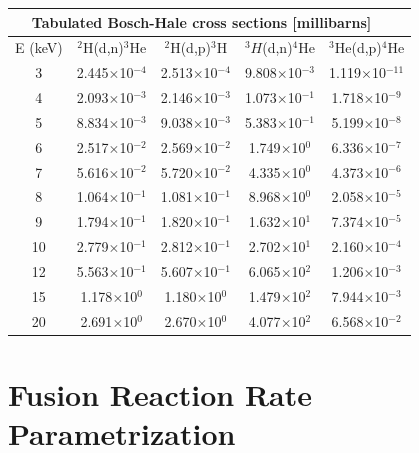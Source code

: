 \noindent
\begin{table}[h!]\small
  \noindent
  \centering
  \begin{tabular}{c c c c c}
    \multicolumn{5}{c}{Tabulated Bosch-Hale cross sections [millibarns]~~\cite{bosch}}\\
    \hline
    E (keV) \T\B& $^2$H(d,n)$^3$He & $^2$H(d,p)$^3$H & $^3H$(d,n)$^4$He & $^3$He(d,p)$^4$He\\
    \hline\hline
    3\T& 2.445$\times$10$^{-4}$ & 2.513$\times$10$^{-4}$ & 9.808$\times$10$^{-3}$ & 1.119$\times$10$^{-11}$ \\ 
    4 & 2.093$\times$10$^{-3}$ & 2.146$\times$10$^{-3}$ & 1.073$\times$10$^{-1}$ & 1.718$\times$10$^{-9}$ \\ 
    5 & 8.834$\times$10$^{-3}$ & 9.038$\times$10$^{-3}$ & 5.383$\times$10$^{-1}$ & 5.199$\times$10$^{-8}$ \\
    6 & 2.517$\times$10$^{-2}$ & 2.569$\times$10$^{-2}$ & 1.749$\times$10$^0$    & 6.336$\times$10$^{-7}$ \\
    7 & 5.616$\times$10$^{-2}$ & 5.720$\times$10$^{-2}$ & 4.335$\times$10$^0$    & 4.373$\times$10$^{-6}$ \\
    8 & 1.064$\times$10$^{-1}$ & 1.081$\times$10$^{-1}$ & 8.968$\times$10$^0$    & 2.058$\times$10$^{-5}$ \\
    9 & 1.794$\times$10$^{-1}$ & 1.820$\times$10$^{-1}$ & 1.632$\times$10$^1$    & 7.374$\times$10$^{-5}$ \\
   10 & 2.779$\times$10$^{-1}$ & 2.812$\times$10$^{-1}$ & 2.702$\times$10$^1$    & 2.160$\times$10$^{-4}$ \\
   12 & 5.563$\times$10$^{-1}$ & 5.607$\times$10$^{-1}$ & 6.065$\times$10$^2$    & 1.206$\times$10$^{-3}$ \\
   15 & 1.178$\times$10$^{0}$  & 1.180$\times$10$^{0}$  & 1.479$\times$10$^2$    & 7.944$\times$10$^{-3}$ \\
   20\B& 2.691$\times$10$^{0}$  & 2.670$\times$10$^{0}$  & 4.077$\times$10$^2$    & 6.568$\times$10$^{-2}$ \\
   \hline
  \end{tabular}
  \label{table:xs}
\end{table}

\vfill

\pagebreak
{}
\section{Fusion Reaction Rate Parametrization}

